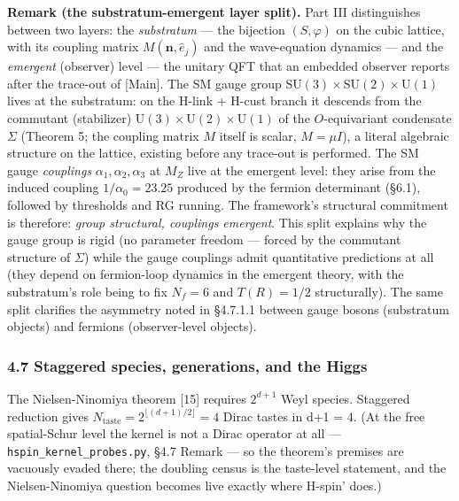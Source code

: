 \documentclass[
]{article}
\begin{document}
\textbf{Remark (the substratum-emergent layer split).} Part III
distinguishes between two layers: the \emph{substratum} --- the
bijection \((S, \varphi)\) on the cubic lattice, with its coupling
matrix \(M(\mathbf{n}, \hat e_j)\) and the wave-equation dynamics ---
and the \emph{emergent} (observer) level --- the unitary QFT that an
embedded observer reports after the trace-out of {[}Main{]}. The SM
gauge group
\(\mathrm{SU}(3) \times \mathrm{SU}(2) \times \mathrm{U}(1)\) lives at
the substratum: on the H-link + H-cust branch it descends from the
commutant (stabilizer)
\(\mathrm{U}(3) \times \mathrm{U}(2) \times \mathrm{U}(1)\) of the
\(O\)-equivariant condensate \(\Sigma\) (Theorem 5; the coupling matrix
\(M\) itself is scalar, \(M = \mu I\)), a literal algebraic structure on
the lattice, existing before any trace-out is performed. The SM gauge
\emph{couplings} \(\alpha_1, \alpha_2, \alpha_3\) at \(M_Z\) live at the
emergent level: they arise from the induced coupling
\(1/\alpha_0 = 23.25\) produced by the fermion determinant (§6.1),
followed by thresholds and RG running. The framework's structural
commitment is therefore: \emph{group structural, couplings emergent}.
This split explains why the gauge group is rigid (no parameter freedom
--- forced by the commutant structure of \(\Sigma\)) while the gauge
couplings admit quantitative predictions at all (they depend on
fermion-loop dynamics in the emergent theory, with the substratum's role
being to fix \(N_f = 6\) and \(T(R) = 1/2\) structurally). The same
split clarifies the asymmetry noted in §4.7.1.1 between gauge bosons
(substratum objects) and fermions (observer-level objects).

\hypertarget{staggered-species-generations-and-the-higgs}{%
\subsubsection{4.7 Staggered species, generations, and the
Higgs}\label{staggered-species-generations-and-the-higgs}}

The Nielsen-Ninomiya theorem {[}15{]} requires \(2^{d+1}\) Weyl species.
Staggered reduction gives
\(N_{\text{taste}} = 2^{\lfloor(d+1)/2\rfloor} = 4\) Dirac tastes in d+1
= 4. (At the free spatial-Schur level the kernel is not a Dirac operator
at all --- \texttt{hspin\_kernel\_probes.py}, §4.7 Remark --- so the
theorem's premises are vacuously evaded there; the doubling census is
the taste-level statement, and the Nielsen-Ninomiya question becomes
live exactly where H-spin' does.)
\end{document}
